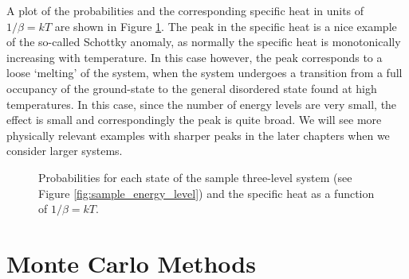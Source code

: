 A plot of the probabilities and the corresponding specific heat in units of $1/\beta=kT$ are shown in Figure \ref{fig:sample_energy_prob}. The peak in the specific heat is a nice example of the so-called Schottky anomaly,\cite{schottky_zur_1922} as normally the specific heat is monotonically increasing with temperature. In this case however, the peak corresponds to a loose `melting' of the system, when the system undergoes a transition from a full occupancy of the ground-state to the general disordered state found at high temperatures. In this case, since the number of energy levels are very small, the effect is small and correspondingly the peak is quite broad. We will see more physically relevant examples with sharper peaks in the later chapters when we consider larger systems.
%
\begin{figure}
  \caption{Probabilities for each state of the sample three-level system (see Figure \ref{fig:sample_energy_level}) and the specific heat as a function of $1/\beta=kT$. }
  \label{fig:sample_energy_prob}
\end{figure}


\section{Monte Carlo Methods}
\label{sec:monte_carlo}

